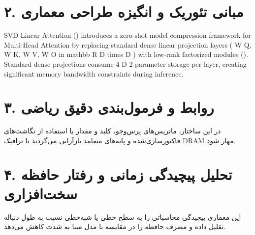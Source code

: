 \documentclass[12pt,a4paper]{article}
\begin{document}
\section*{۲. مبانی تئوریک و انگیزه طراحی معماری}
SVD Linear Attention () introduces a zero-shot model compression framework for Multi-Head Attention by replacing standard dense linear projection layers ( W Q, W K, W V, W O in mathbb R D times D ) with low-rank factorized modules (). Standard dense projections consume 4 D 2 parameter storage per layer, creating significant memory bandwidth constraints during inference.

\section*{۳. روابط و فرمول‌بندی دقیق ریاضی}
در این ساختار، ماتریس‌های پرس‌وجو، کلید و مقدار با استفاده از نگاشت‌های فاکتورسازی‌شده و پایه‌های متعامد بازآرایی می‌گردند تا ترافیک DRAM مهار شود.

\section*{۴. تحلیل پیچیدگی زمانی و رفتار حافظه سخت‌افزاری}
این معماری پیچیدگی محاسباتی را به سطح خطی یا شبه‌خطی نسبت به طول دنباله تقلیل داده و مصرف حافظه را در مقایسه با مدل مبنا به شدت کاهش می‌دهد.
\end{document}
